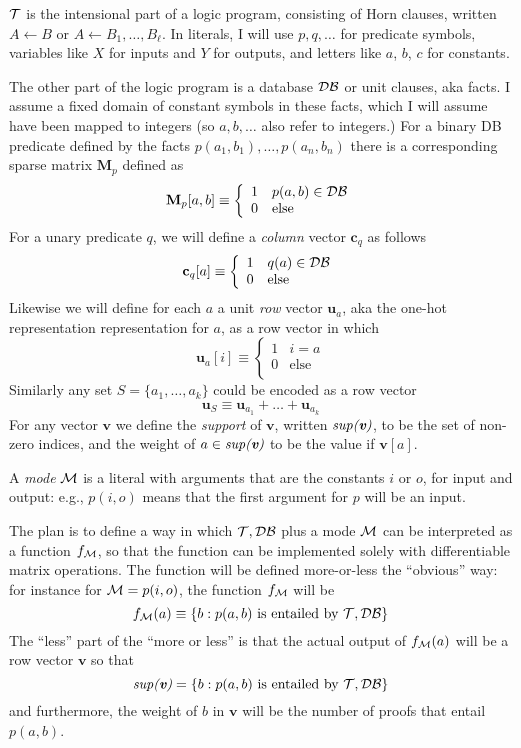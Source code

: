 \documentclass[12pt]{article}
\newcommand{\trm}[1]{\textit{#1}}
\newcommand{\vek}[1]{\textbf{#1}}
\newcommand{\M}{\textbf{M}}
\newcommand{\support}[1]{\textit{sup({#1})}}
\begin{document}
${\cal T}$ is the intensional part of a logic program, consisting of Horn
clauses, written $A\leftarrow{}B$ or $A\leftarrow{}B_1,\ldots,B_\ell$.
In literals, I will use $p,q,\ldots$ for predicate symbols, variables
like $X$ for inputs and $Y$ for outputs, and letters like $a$, $b$,
$c$ for constants.

The other part of the logic program is a database ${\cal DB}$ or unit
clauses, aka facts.  I assume a fixed domain of constant symbols in
these facts, which I will assume have been mapped to integers (so
$a,b,\ldots$ also refer to integers.)  For a binary DB predicate
defined by the facts $p(a_1,b_1),\ldots,p(a_n,b_n)$ there is a
corresponding sparse matrix $\M_p$ defined as
\[
  \M_p[a,b] \equiv \left \{
   \begin{array}{ll}
     1 & p(a,b) \in {\cal DB} \\
     0 & \mbox{else} \\
   \end{array}
   \right.
\]
For a unary predicate $q$, we will define a \emph{column} vector
$\vek{c}_q$ as follows
\[
  \vek{c}_q[a] \equiv \left \{
   \begin{array}{ll}
     1 & q(a) \in {\cal DB} \\
     0 & \mbox{else} \\
   \end{array}
   \right.
\]
Likewise we will define for each $a$ a unit \emph{row} vector
$\vek{u}_a$, aka the one-hot representation representation for $a$, as
a row vector in which
\[
  \vek{u}_a[i] \equiv \left \{
   \begin{array}{ll}
     1 & \mbox{$i=a$} \\
     0 & \mbox{else} \\
   \end{array}
   \right.
\]
Similarly any set $S=\{a_1,\ldots,a_k\}$ could be encoded as a row
vector 
\[ \vek{u}_S \equiv \vek{u}_{a_1} + \ldots + \vek{u}_{a_k}
\]
For any vector $\vek{v}$ we define the \trm{support} of $\vek{v}$,
written $\support{\vek{v}}$, to be the set of non-zero indices, and the
weight of $a \in \support{\vek{v}}$ to be the value if $\vek{v}[a]$.

A \trm{mode} ${\cal M}$ is a literal with arguments that are the constants
$i$ or $o$, for input and output: e.g., $p(i,o)$ means that the first
argument for $p$ will be an input.

The plan is to define a way in which ${\cal T,DB}$ plus a mode ${\cal
  M}$ can be interpreted as a function $f_{\cal M}$, so that the
function can be implemented solely with differentiable matrix
operations.  The function will be defined more-or-less the ``obvious''
way: for instance for ${\cal M}=p(i,o)$, the function $f_{\cal M}$
will be
\[ f_{\cal M}(a) \equiv \{ b : p(a,b) \mbox{~is entailed by~} {\cal T,DB} \}
\]
The ``less'' part of the ``more or less'' is that the actual output of
$f_{\cal M}(a)$ will be a row vector $\vek{v}$ so that 
\[ \support{\vek{v}} = \{ b : p(a,b) \mbox{~is entailed by~} {\cal T,DB} \}
\]
and furthermore, the weight of $b$ in $\vek{v}$ will be the number of
proofs that entail $p(a,b)$.
\end{document}
